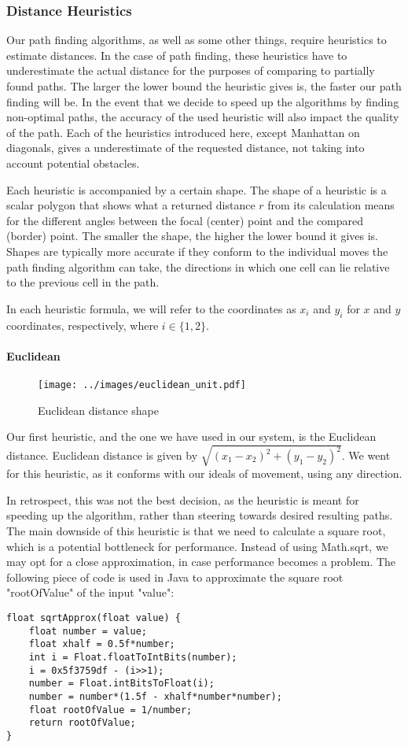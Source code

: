 \subsubsection{Distance Heuristics}
Our path finding algorithms, as well as some other things, require heuristics to estimate distances. In the case of path finding, these heuristics have to underestimate the actual distance for the purposes of comparing to partially found paths. The larger the lower bound the heuristic gives is, the faster our path finding will be. In the event that we decide to speed up the algorithms by finding non-optimal paths, the accuracy of the used heuristic will also impact the quality of the path. Each of the heuristics introduced here, except Manhattan on diagonals, gives a underestimate of the requested distance, not taking into account potential obstacles. 

Each heuristic is accompanied by a certain shape. The shape of a heuristic is a scalar polygon that shows what a returned distance $r$ from its calculation means for the different angles between the focal (center) point and the compared (border) point. The smaller the shape, the higher the lower bound it gives is. Shapes are typically more accurate if they conform to the individual moves the path finding algorithm can take, the directions in which one cell can lie relative to the previous cell in the path. 

In each heuristic formula, we will refer to the coordinates as $x_i$ and $y_i$ for $x$ and $y$ coordinates, respectively, where $i \in \{ 1, 2\}$.

\paragraph{Euclidean}
\label{sec:euclidean}
\begin{wrapfigure}{r}{0.30\textwidth}
\texttt{[image: ../images/euclidean\_unit.pdf]}
\caption{Euclidean distance shape}
\end{wrapfigure}
Our first heuristic, and the one we have used in our system, is the Euclidean distance. Euclidean distance is given by $\sqrt{(x_1 - x_2)^2 + (y_1 - y_2)^2}$. We went for this heuristic, as it conforms with our ideals of movement, using any direction.

In retrospect, this was not the best decision, as the heuristic is meant for speeding up the algorithm, rather than steering towards desired resulting paths. The main downside of this heuristic is that we need to calculate a square root, which is a potential bottleneck for performance. Instead of using Math.sqrt, we may opt for a close approximation, in case performance becomes a problem. The following piece of code is used in Java to approximate the square root "rootOfValue" of the input "value":
\begin{lstlisting}
float sqrtApprox(float value) {
	float number = value;
	float xhalf = 0.5f*number;
	int i = Float.floatToIntBits(number);
	i = 0x5f3759df - (i>>1);
	number = Float.intBitsToFloat(i);
	number = number*(1.5f - xhalf*number*number);
	float rootOfValue = 1/number;
	return rootOfValue;
}
\end{lstlisting}

